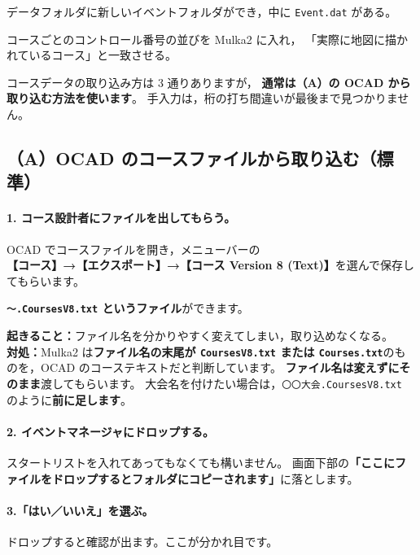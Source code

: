 \begin{Done}
データフォルダに新しいイベントフォルダができ，中に \texttt{Event.dat} がある。
\end{Done}


\begin{Goal}
コースごとのコントロール番号の並びを Mulka2 に入れ，
「実際に地図に描かれているコース」と一致させる。
\end{Goal}

コースデータの取り込み方は 3 通りありますが，
\textbf{通常は（A）の OCAD から取り込む方法を使います}。
手入力は，桁の打ち間違いが最後まで見つかりません。

\subsection*{（A）OCAD のコースファイルから取り込む（標準）}

\paragraph{1. コース設計者にファイルを出してもらう。}
OCAD でコースファイルを開き，メニューバーの\\
\textbf{【コース】→【エクスポート】→【コース Version 8 (Text)】}を選んで保存してもらいます。\ver

\textbf{\texttt{〜.CoursesV8.txt} というファイル}ができます。

\begin{Fail}
\textbf{起きること：}ファイル名を分かりやすく変えてしまい，取り込めなくなる。\\
\textbf{対処：}Mulka2 は\textbf{ファイル名の末尾が \texttt{CoursesV8.txt} または
\texttt{Courses.txt}}のものを，OCAD のコーステキストだと判断しています。
\textbf{ファイル名は変えずにそのまま}渡してもらいます。
大会名を付けたい場合は，\texttt{〇〇大会.CoursesV8.txt} のように\textbf{前に足します}。
\end{Fail}

\paragraph{2. イベントマネージャにドロップする。}
スタートリストを入れてあってもなくても構いません。
画面下部の\textbf{「ここにファイルをドロップするとフォルダにコピーされます」}に落とします。

\paragraph{3.「はい／いいえ」を選ぶ。}
ドロップすると確認が出ます。ここが分かれ目です。

